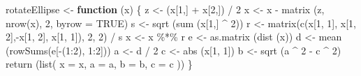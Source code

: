 \documentclass[
  12pt,
  letterpaper,
  DIV=11,
  numbers=noendperiod]{scrreprt}
\newenvironment{Shaded}{\begin{snugshade}}{\end{snugshade}}
\newcommand{\AttributeTok}[1]{\textcolor[rgb]{0.40,0.45,0.13}{#1}}
\newcommand{\ConstantTok}[1]{\textcolor[rgb]{0.56,0.35,0.01}{#1}}
\newcommand{\ControlFlowTok}[1]{\textcolor[rgb]{0.00,0.23,0.31}{\textbf{#1}}}
\newcommand{\DecValTok}[1]{\textcolor[rgb]{0.68,0.00,0.00}{#1}}
\newcommand{\FunctionTok}[1]{\textcolor[rgb]{0.28,0.35,0.67}{#1}}
\newcommand{\NormalTok}[1]{\textcolor[rgb]{0.00,0.23,0.31}{#1}}
\newcommand{\OtherTok}[1]{\textcolor[rgb]{0.00,0.23,0.31}{#1}}
\newcommand{\SpecialCharTok}[1]{\textcolor[rgb]{0.37,0.37,0.37}{#1}}
\theoremstyle{remark}
\begin{document}
\begin{Shaded}
\begin{Highlighting}[]
\NormalTok{rotateEllipse }\OtherTok{\textless{}{-}} \ControlFlowTok{function}\NormalTok{ (x) \{}
\NormalTok{  z }\OtherTok{\textless{}{-}}\NormalTok{ (x[}\DecValTok{1}\NormalTok{,] }\SpecialCharTok{+}\NormalTok{ x[}\DecValTok{2}\NormalTok{,]) }\SpecialCharTok{/} \DecValTok{2}
\NormalTok{  x }\OtherTok{\textless{}{-}}\NormalTok{ x }\SpecialCharTok{{-}} \FunctionTok{matrix}\NormalTok{ (z, }\FunctionTok{nrow}\NormalTok{(x), }\DecValTok{2}\NormalTok{, }\AttributeTok{byrow =} \ConstantTok{TRUE}\NormalTok{)}
\NormalTok{  s }\OtherTok{\textless{}{-}} \FunctionTok{sqrt}\NormalTok{ (}\FunctionTok{sum}\NormalTok{ (x[}\DecValTok{1}\NormalTok{,] }\SpecialCharTok{\^{}} \DecValTok{2}\NormalTok{))}
\NormalTok{  r }\OtherTok{\textless{}{-}} \FunctionTok{matrix}\NormalTok{(}\FunctionTok{c}\NormalTok{(x[}\DecValTok{1}\NormalTok{, }\DecValTok{1}\NormalTok{], x[}\DecValTok{1}\NormalTok{, }\DecValTok{2}\NormalTok{],}\SpecialCharTok{{-}}\NormalTok{x[}\DecValTok{1}\NormalTok{, }\DecValTok{2}\NormalTok{], x[}\DecValTok{1}\NormalTok{, }\DecValTok{1}\NormalTok{]), }\DecValTok{2}\NormalTok{, }\DecValTok{2}\NormalTok{) }\SpecialCharTok{/}\NormalTok{ s}
\NormalTok{  x }\OtherTok{\textless{}{-}}\NormalTok{ x }\SpecialCharTok{\%*\%}\NormalTok{ r}
\NormalTok{  e }\OtherTok{\textless{}{-}} \FunctionTok{as.matrix}\NormalTok{ (}\FunctionTok{dist}\NormalTok{ (x))}
\NormalTok{  d }\OtherTok{\textless{}{-}} \FunctionTok{mean}\NormalTok{ (}\FunctionTok{rowSums}\NormalTok{(e[}\SpecialCharTok{{-}}\NormalTok{(}\DecValTok{1}\SpecialCharTok{:}\DecValTok{2}\NormalTok{), }\DecValTok{1}\SpecialCharTok{:}\DecValTok{2}\NormalTok{]))}
\NormalTok{  a }\OtherTok{\textless{}{-}}\NormalTok{ d }\SpecialCharTok{/} \DecValTok{2}
\NormalTok{  c }\OtherTok{\textless{}{-}} \FunctionTok{abs}\NormalTok{ (x[}\DecValTok{1}\NormalTok{, }\DecValTok{1}\NormalTok{])}
\NormalTok{  b }\OtherTok{\textless{}{-}} \FunctionTok{sqrt}\NormalTok{ (a }\SpecialCharTok{\^{}} \DecValTok{2} \SpecialCharTok{{-}}\NormalTok{ c }\SpecialCharTok{\^{}} \DecValTok{2}\NormalTok{)}
  \FunctionTok{return}\NormalTok{ (}\FunctionTok{list}\NormalTok{(}
    \AttributeTok{x =}\NormalTok{ x,}
    \AttributeTok{a =}\NormalTok{ a,}
    \AttributeTok{b =}\NormalTok{ b,}
    \AttributeTok{c =}\NormalTok{ c}
\NormalTok{  ))}
\NormalTok{\}}


\end{Highlighting}
\end{Shaded}
\end{document}
